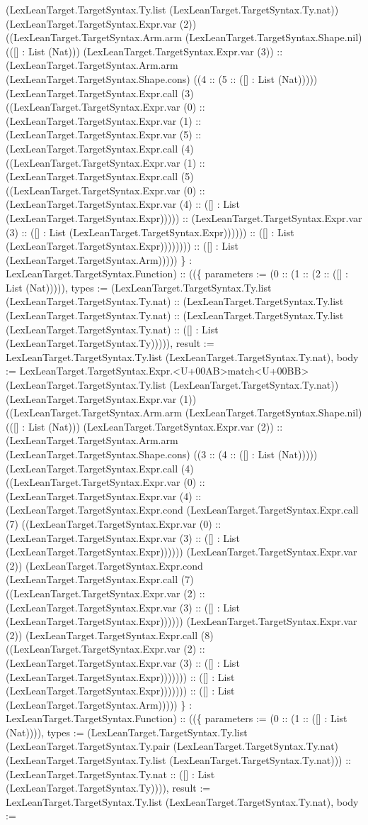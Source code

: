 \documentclass[11pt]{article}
\begin{document}
(LexLeanTarget.TargetSyntax.Ty.list (LexLeanTarget.TargetSyntax.Ty.nat)) (LexLeanTarget.TargetSyntax.Expr.var (2)) ((LexLeanTarget.TargetSyntax.Arm.arm (LexLeanTarget.TargetSyntax.Shape.nil) (([] : List (Nat))) (LexLeanTarget.TargetSyntax.Expr.var (3)) :: (LexLeanTarget.TargetSyntax.Arm.arm (LexLeanTarget.TargetSyntax.Shape.cons) ((4 :: (5 :: ([] : List (Nat))))) (LexLeanTarget.TargetSyntax.Expr.call (3) ((LexLeanTarget.TargetSyntax.Expr.var (0) :: (LexLeanTarget.TargetSyntax.Expr.var (1) :: (LexLeanTarget.TargetSyntax.Expr.var (5) :: (LexLeanTarget.TargetSyntax.Expr.call (4) ((LexLeanTarget.TargetSyntax.Expr.var (1) :: (LexLeanTarget.TargetSyntax.Expr.call (5) ((LexLeanTarget.TargetSyntax.Expr.var (0) :: (LexLeanTarget.TargetSyntax.Expr.var (4) :: ([] : List (LexLeanTarget.TargetSyntax.Expr))))) :: (LexLeanTarget.TargetSyntax.Expr.var (3) :: ([] : List (LexLeanTarget.TargetSyntax.Expr)))))) :: ([] : List (LexLeanTarget.TargetSyntax.Expr)))))))) :: ([] : List (LexLeanTarget.TargetSyntax.Arm))))) \} : LexLeanTarget.TargetSyntax.Function) :: ((\{ parameters := (0 :: (1 :: (2 :: ([] : List (Nat))))), types := (LexLeanTarget.TargetSyntax.Ty.list (LexLeanTarget.TargetSyntax.Ty.nat) :: (LexLeanTarget.TargetSyntax.Ty.list (LexLeanTarget.TargetSyntax.Ty.nat) :: (LexLeanTarget.TargetSyntax.Ty.list (LexLeanTarget.TargetSyntax.Ty.nat) :: ([] : List (LexLeanTarget.TargetSyntax.Ty))))), result := LexLeanTarget.TargetSyntax.Ty.list (LexLeanTarget.TargetSyntax.Ty.nat), body := LexLeanTarget.TargetSyntax.Expr.<U+00AB>match<U+00BB> (LexLeanTarget.TargetSyntax.Ty.list (LexLeanTarget.TargetSyntax.Ty.nat)) (LexLeanTarget.TargetSyntax.Expr.var (1)) ((LexLeanTarget.TargetSyntax.Arm.arm (LexLeanTarget.TargetSyntax.Shape.nil) (([] : List (Nat))) (LexLeanTarget.TargetSyntax.Expr.var (2)) :: (LexLeanTarget.TargetSyntax.Arm.arm (LexLeanTarget.TargetSyntax.Shape.cons) ((3 :: (4 :: ([] : List (Nat))))) (LexLeanTarget.TargetSyntax.Expr.call (4) ((LexLeanTarget.TargetSyntax.Expr.var (0) :: (LexLeanTarget.TargetSyntax.Expr.var (4) :: (LexLeanTarget.TargetSyntax.Expr.cond (LexLeanTarget.TargetSyntax.Expr.call (7) ((LexLeanTarget.TargetSyntax.Expr.var (0) :: (LexLeanTarget.TargetSyntax.Expr.var (3) :: ([] : List (LexLeanTarget.TargetSyntax.Expr)))))) (LexLeanTarget.TargetSyntax.Expr.var (2)) (LexLeanTarget.TargetSyntax.Expr.cond (LexLeanTarget.TargetSyntax.Expr.call (7) ((LexLeanTarget.TargetSyntax.Expr.var (2) :: (LexLeanTarget.TargetSyntax.Expr.var (3) :: ([] : List (LexLeanTarget.TargetSyntax.Expr)))))) (LexLeanTarget.TargetSyntax.Expr.var (2)) (LexLeanTarget.TargetSyntax.Expr.call (8) ((LexLeanTarget.TargetSyntax.Expr.var (2) :: (LexLeanTarget.TargetSyntax.Expr.var (3) :: ([] : List (LexLeanTarget.TargetSyntax.Expr))))))) :: ([] : List (LexLeanTarget.TargetSyntax.Expr))))))) :: ([] : List (LexLeanTarget.TargetSyntax.Arm))))) \} : LexLeanTarget.TargetSyntax.Function) :: ((\{ parameters := (0 :: (1 :: ([] : List (Nat)))), types := (LexLeanTarget.TargetSyntax.Ty.list (LexLeanTarget.TargetSyntax.Ty.pair (LexLeanTarget.TargetSyntax.Ty.nat) (LexLeanTarget.TargetSyntax.Ty.list (LexLeanTarget.TargetSyntax.Ty.nat))) :: (LexLeanTarget.TargetSyntax.Ty.nat :: ([] : List (LexLeanTarget.TargetSyntax.Ty)))), result := LexLeanTarget.TargetSyntax.Ty.list (LexLeanTarget.TargetSyntax.Ty.nat), body := 
\end{document}
